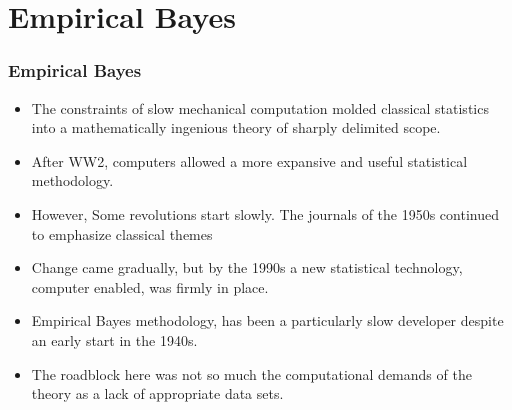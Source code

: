 \documentclass[
  shownotes,
  xcolor={svgnames},
  hyperref={colorlinks,citecolor=DarkBlue,linkcolor=DarkRed,urlcolor=DarkBlue}
  ]{beamer}
\begin{document}
\section{Empirical Bayes}
\begin{frame}[fragile]
\frametitle{Empirical Bayes}


\begin{itemize}
  \small
\item The constraints of slow mechanical computation molded classical statistics into a mathematically ingenious theory of sharply delimited scope. 
\medskip
\item After WW2, computers  allowed a more expansive and useful statistical methodology.
\medskip
\item However, Some revolutions start slowly. The journals of the 1950s continued to emphasize classical themes
\medskip
\item Change came gradually, but by the 1990s a new statistical technology, computer enabled, was firmly in place. 
\medskip
\item Empirical Bayes methodology, has been a particularly slow developer despite an early start in the 1940s. 
\medskip
\item The roadblock here was not so much the computational demands of the theory as a lack of appropriate data sets. 

\end{itemize}
\end{frame}
\end{document}
